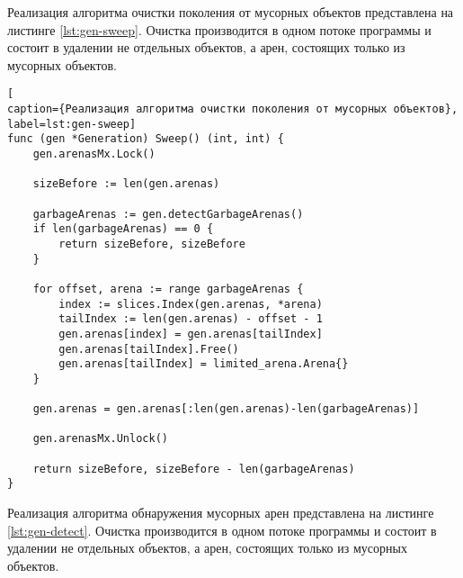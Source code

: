 Реализация алгоритма очистки поколения от мусорных объектов представлена на листинге \ref{lst:gen-sweep}. Очистка производится в одном потоке программы и состоит в удалении не отдельных объектов, а арен, состоящих только из мусорных объектов.

\begin{lstlisting}[
caption={Реализация алгоритма очистки поколения от мусорных объектов},
label=lst:gen-sweep]
func (gen *Generation) Sweep() (int, int) {
	gen.arenasMx.Lock()
	
	sizeBefore := len(gen.arenas)
	
	garbageArenas := gen.detectGarbageArenas()
	if len(garbageArenas) == 0 {
		return sizeBefore, sizeBefore
	}
	
	for offset, arena := range garbageArenas {
		index := slices.Index(gen.arenas, *arena)
		tailIndex := len(gen.arenas) - offset - 1
		gen.arenas[index] = gen.arenas[tailIndex]
		gen.arenas[tailIndex].Free()
		gen.arenas[tailIndex] = limited_arena.Arena{}
	}
	
	gen.arenas = gen.arenas[:len(gen.arenas)-len(garbageArenas)]
	
	gen.arenasMx.Unlock()
	
	return sizeBefore, sizeBefore - len(garbageArenas)
}
\end{lstlisting}

Реализация алгоритма обнаружения мусорных арен представлена на листинге \ref{lst:gen-detect}. Очистка производится в одном потоке программы и состоит в удалении не отдельных объектов, а арен, состоящих только из мусорных объектов.

